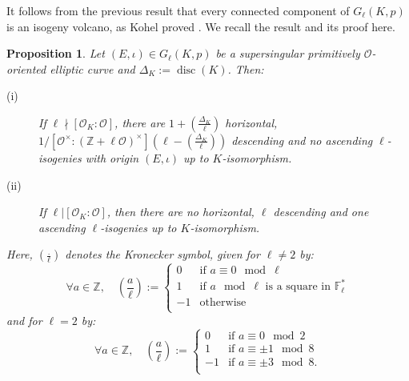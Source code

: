 \documentclass[a4paper,10pt,notitlepage]{report}
\theoremstyle{definition}
\theoremstyle{plain}
\newtheorem{Proposition}[Definition]{Proposition}
\theoremstyle{definition}
\newcommand{\Z}{\mathbb{Z}}
\newcommand{\F}{\mathbb{F}}
\newcommand{\mO}{\mathcal{O}}
\renewcommand{\(}{\left(}
\renewcommand{\)}{\right)}
\DeclareMathOperator{\disc}{disc}
\begin{document}

It follows from the previous result that every connected component of $G_\ell(K,p)$ is an isogeny volcano, as Kohel proved \cite[Proposition 23]{Kohel_thesis}. We recall the result and its proof here.

\begin{Proposition}\label{Proposition 5}
Let $(E,\iota)\in G_\ell(K,p)$ be a supersingular primitively $\mO$-oriented elliptic curve and $\Delta_K:=\disc(K)$. Then:
\begin{description}
\item[(i)] If $\ell\nmid [\mO_K:\mO]$, there are $1+\(\frac{\Delta_K}{\ell}\)$ horizontal, $1/[\mO^\times:(\Z+\ell\mO)^\times]\(\ell-\(\frac{\Delta_K}{\ell}\)\)$ descending and no ascending $\ell$-isogenies with origin $(E,\iota)$ up to $K$-isomorphism.
\item[(ii)] If $\ell|[\mO_K:\mO]$, then there are no horizontal, $\ell$ descending and one ascending $\ell$-isogenies up to $K$-isomorphism.
\end{description}

Here, $\(\frac{.}{\ell}\)$ denotes the Kronecker symbol, given for $\ell\neq 2$ by:
\[\forall a\in\Z, \quad\(\frac{a}{\ell}\):=\left\{\begin{array}{cl}
0 & \mbox{if } a\equiv 0 \mod\ell \\
1 & \mbox{if } a \mod \ell \mbox{ is a square in } \F_\ell^*\\
-1 & \mbox{otherwise}\\
\end{array}\right.\]
and for $\ell=2$ by:
\[\forall a\in\Z, \quad \(\frac{a}{\ell}\):=\left\{\begin{array}{cl}
0 & \mbox{if } a\equiv 0 \mod 2 \\
1 & \mbox{if } a\equiv \pm 1 \mod 8\\
-1 & \mbox{if } a\equiv \pm 3 \mod 8.\\
\end{array}\right.\]
\end{Proposition}
\end{document}
